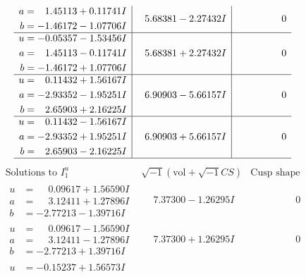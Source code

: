 \documentclass[1p]{elsarticle_modified}
\theoremstyle{definition}
\newcommand{\I}{\sqrt{-1}}
\begin{document}
$$\begin{array}{c|c|c}
\begin{aligned}
a &= \phantom{-}1.45113 + 0.11741 I \\
b &= -1.46172 - 1.07706 I\end{aligned}
 & \phantom{-}5.68381 - 2.27432 I & \phantom{-0.000000 } 0 \\ \hline\begin{aligned}
u &= -0.05357 - 1.53456 I \\
a &= \phantom{-}1.45113 - 0.11741 I \\
b &= -1.46172 + 1.07706 I\end{aligned}
 & \phantom{-}5.68381 + 2.27432 I & \phantom{-0.000000 } 0 \\ \hline\begin{aligned}
u &= \phantom{-}0.11432 + 1.56167 I \\
a &= -2.93352 - 1.95251 I \\
b &= \phantom{-}2.65903 + 2.16225 I\end{aligned}
 & \phantom{-}6.90903 - 5.66157 I & \phantom{-0.000000 } 0 \\ \hline\begin{aligned}
u &= \phantom{-}0.11432 - 1.56167 I \\
a &= -2.93352 + 1.95251 I \\
b &= \phantom{-}2.65903 - 2.16225 I\end{aligned}
 & \phantom{-}6.90903 + 5.66157 I & \phantom{-0.000000 } 0\\
 \hline 
 \end{array}$$\newpage$$\begin{array}{c|c|c}  
\text{Solutions to }I^u_{1}& \I (\text{vol} + \sqrt{-1}CS) & \text{Cusp shape}\\
 \hline 
\begin{aligned}
u &= \phantom{-}0.09617 + 1.56590 I \\
a &= \phantom{-}3.12411 + 1.27896 I \\
b &= -2.77213 - 1.39716 I\end{aligned}
 & \phantom{-}7.37300 - 1.26295 I & \phantom{-0.000000 } 0 \\ \hline\begin{aligned}
u &= \phantom{-}0.09617 - 1.56590 I \\
a &= \phantom{-}3.12411 - 1.27896 I \\
b &= -2.77213 + 1.39716 I\end{aligned}
 & \phantom{-}7.37300 + 1.26295 I & \phantom{-0.000000 } 0 \\ \hline\begin{aligned}
u &= -0.15237 + 1.56573 I \\

\end{aligned}
\end{array}$$
\end{document}

